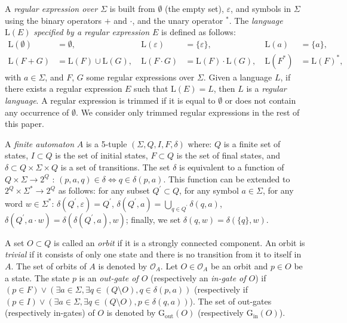 \documentclass{llncs}
\begin{document}
	A \emph{regular expression over $\Sigma$} is built from $\emptyset$ (the empty set), $\varepsilon$, and symbols in $\Sigma$ using the binary operators $+$ and $\cdot$, and the unary operator $^*$.
	The \emph{language} $\mathrm{L}(E)$ \emph{specified by a regular expression $E$} is defined as follows:
\begin{align*}
	\mathrm{L}(\emptyset) &= \emptyset, & \mathrm{L}(\varepsilon) &= \{\varepsilon\}, & \mathrm{L}(a) &= \{a\},\\
	\mathrm{L}(F + G) &= \mathrm{L}(F) \cup \mathrm{L}(G),\  & \mathrm{L}(F \cdot G) &= \mathrm{L}(F) \cdot \mathrm{L}(G),\  & \mathrm{L}(F^*) &= \mathrm{L}(F)^*,
\end{align*}
with $a \in \Sigma$, and $F$, $G$ some regular expressions over $\Sigma$.
	Given a language $L$, if there exists a regular expression $E$ such that $\mathrm{L}(E) = L$, then $L$ is a \emph{regular language}.
	A regular expression is trimmed if it is equal to $\emptyset$ or does not contain any occurrence of $\emptyset$.
	We consider only trimmed regular expressions in the rest of this paper.

	A \emph{finite automaton} $A$ is a 5-tuple $(\Sigma, Q, I, F, \delta)$ where:
$Q$ is a finite set of states, $I \subset Q$ is the set of initial states, $F \subset Q$ is the set of final states, and $\delta \subset Q \times \Sigma \times Q$ is a set of transitions.
The set $\delta$ is equivalent to a function of $Q \times \Sigma \rightarrow 2^Q$ : $(p, a, q) \in \delta \Longleftrightarrow q \in \delta (p, a)$.
This function can be extended to $2^Q \times \Sigma^* \rightarrow 2^Q$ as follows: for any subset $Q^{\prime} \subset Q$, for any symbol $a \in \Sigma$, for any word $w \in \Sigma^*$: $\delta(Q^{\prime}, \varepsilon) = Q^{\prime}$, $\delta(Q^{\prime}, a) = \bigcup_{q \in Q^{\prime}} \delta (q, a)$, $\delta(Q^{\prime}, a \cdot w) = \delta(\delta(Q^{\prime}, a), w)$; finally, we set $\delta(q, w)=\delta(\{q\}, w)$.

	A set $O \subset Q$ is called an \emph{orbit} if it is a strongly connected component.
An orbit is \emph{trivial} if it consists of only one state and there is no transition from it to itself in $A$.
The set of orbits of $A$ is denoted by $\mathcal{O}_A$.
	Let $O \in \mathcal{O}_A$ be an orbit and $p \in O$ be a state. The state $p$ is an \emph{out-gate of $O$} (respectively an \emph{in-gate of $O$}) if $(p \in F) \vee (\exists a \in \Sigma, \exists q \in (Q \setminus O), q \in \delta(p, a))$ (respectively if $(p \in I) \vee (\exists a \in \Sigma, \exists q \in (Q \setminus O), p \in \delta(q, a))$).
	The set of out-gates (respectively in-gates) of $O$ is denoted by $\mathrm{G_{out}}(O)$ (respectively $\mathrm{G_{in}}(O)$).
\end{document}
